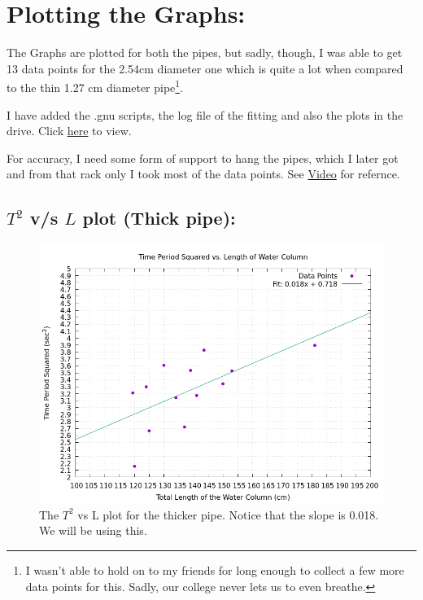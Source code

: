 \documentclass[twocolumn,11pt]{article}
\begin{document}
\section{Plotting the Graphs:}
The Graphs are plotted for both the pipes, but sadly, though, I was able to get 13 data points for the 2.54cm diameter one which is quite a lot when compared to the thin 1.27 cm diameter pipe\footnote{I wasn't able to hold on to my friends for long enough to collect a few more data points for this. Sadly, our college never lets us to even breathe.}. 

\begin{tcolorbox}[width=8cm,colback={aqua},title={Note 01},colbacktitle=white,coltitle=black]    
    I have added the .gnu scripts, the log file of the fitting and also the plots in the drive. Click \href{https://drive.google.com/drive/folders/1RKSEggA8p61pM14YIgWOVmSHRRIRab_b?usp=sharing}{here} to view.
\end{tcolorbox}

\begin{tcolorbox}[width=8cm,colback={aqua},title={Note 02},colbacktitle=white,coltitle=black]    
    For accuracy, I need some form of support to hang the pipes, which I later got and from that rack only I took most of the data points. See \href{https://drive.google.com/file/d/1B0Kj0nX2NHbx1PAJz2C6tWp1hRgPLPga/view?usp=drive_link}{Video} for refernce.
\end{tcolorbox}

\subsection{$T^2$ v/s $L$ plot (Thick pipe):}
\begin{figure}[H]
    \centering
    \includegraphics[scale=0.3]{T2_vs_L.png}
    \caption{The $T^2$ vs L plot for the thicker pipe. Notice that the slope is 0.018. We will be using this.}
    \label{T2_vs_L}
\end{figure}
\end{document}
